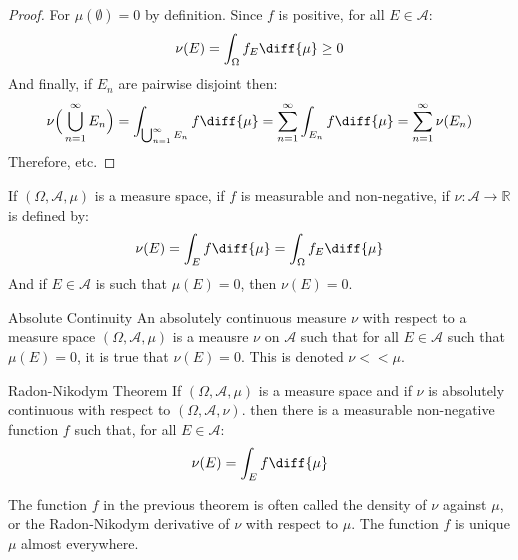    \begin{proof}
        For $\mu(\emptyset)=0$ by definition. Since $f$ is positive,
        for all $E\in\mathcal{A}$:
        \begin{equation}
            \nu(E)=\int_{\Omega}f_{E}\diff{\mu}\geq{0}
        \end{equation}
        And finally, if $E_{n}$ are pairwise disjoint then:
        \begin{equation}
            \nu\Big(\bigcup_{n=1}^{\infty}E_{n}\Big)=
            \int_{\bigcup_{n=1}^{\infty}E_{n}}f\diff{\mu}
            =\sum_{n=1}^{\infty}\int_{E_{n}}f\diff{\mu}
            =\sum_{n=1}^{\infty}\nu(E_{n})
        \end{equation}
        Therefore, etc.
    \end{proof}
    \begin{theorem}
        If $(\Omega,\mathcal{A},\mu)$ is a measure space,
        if $f$ is measurable and non-negative, if
        $\nu:\mathcal{A}\rightarrow\mathbb{R}$ is defined by:
        \begin{equation}
            \nu(E)=\int_{E}f\diff{\mu}=
            \int_{\Omega}f_{E}\diff{\mu}
        \end{equation}
        And if $E\in\mathcal{A}$ is such that $\mu(E)=0$, then
        $\nu(E)=0$.
    \end{theorem}
    \begin{ldefinition}{Absolute Continuity}
        An absolutely continuous measure $\nu$ with respect
        to a measure space $(\Omega,\mathcal{A},\mu)$ is a meausre
        $\nu$ on $\mathcal{A}$ such that for all $E\in\mathcal{A}$
        such that $\mu(E)=0$, it is true that $\nu(E)=0$. This is
        denoted $\nu<<\mu$.
    \end{ldefinition}
    \begin{ltheorem}{Radon-Nikodym Theorem}
        If $(\Omega,\mathcal{A},\mu)$ is a measure space and if
        $\nu$ is absolutely continuous with respect to
        $(\Omega,\mathcal{A},\nu)$. then there is a measurable
        non-negative function $f$ such that, for all $E\in\mathcal{A}$:
        \begin{equation}
            \nu(E)=\int_{E}f\diff{\mu}
        \end{equation}
    \end{ltheorem}
    The function $f$ in the previous theorem is often called the
    density of $\nu$ against $\mu$, or the
    Radon-Nikodym derivative of $\nu$ with respect to $\mu$. The
    function $f$ is unique $\mu$ almost everywhere.